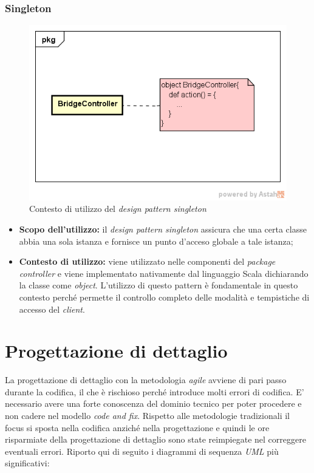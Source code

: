 \subsubsection{Singleton}
\begin{figure}[h]
\centering
\includegraphics[scale=0.50]{immagini/singleton}
\caption{Contesto di utilizzo del \emph{design pattern singleton}}
\label{fig:pattern-singleton}
\end{figure}
\begin{itemize}
\item\textbf{Scopo dell'utilizzo:} il \emph{design pattern singleton} assicura che una certa classe abbia una sola istanza e fornisce un punto d'acceso globale a tale istanza;
\item \textbf{Contesto di utilizzo:} viene utilizzato nelle componenti del \emph{package controller} e viene implementato nativamente dal linguaggio Scala dichiarando la classe come \emph{object}. L'utilizzo di questo pattern è fondamentale in questo contesto perché permette il controllo completo delle modalità e tempistiche di accesso del \emph{client}.
\end{itemize}



\newpage
\section{Progettazione di dettaglio}
La progettazione di dettaglio con la metodologia \emph{agile} avviene di pari passo durante la codifica, il che è rischioso perché introduce molti errori di codifica. E' necessario avere una forte conoscenza del dominio tecnico per poter procedere e non cadere nel modello \emph{code and fix}. Rispetto alle metodologie tradizionali il focus si sposta nella codifica anziché nella progettazione e quindi le ore risparmiate della progettazione di dettaglio sono state reimpiegate nel correggere eventuali errori. Riporto qui di seguito i diagrammi di sequenza \emph{UML} più significativi:
